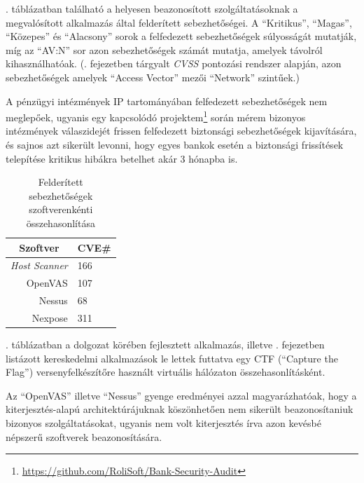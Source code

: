 	\Az{\ref{cpevulns}}. táblázatban található a helyesen beazonosított szolgáltatásoknak a megvalósított alkalmazás által felderített sebezhetőségei. A ``Kritikus'', ``Magas'', ``Közepes'' és ``Alacsony'' sorok a felfedezett sebezhetőségek súlyosságát mutatják, míg az ``AV:N'' sor azon sebezhetőségek számát mutatja, amelyek távolról kihasználhatóak. (\Az{\ref{ssec:cvss}}. fejezetben tárgyalt \textit{CVSS} pontozási rendszer alapján, azon sebezhetőségek amelyek ``Access Vector'' mezői ``Network'' szintűek.)
	
	A pénzügyi intézmények IP tartományában felfedezett sebezhetőségek nem meglepőek, ugyanis egy kapcsolódó projektem\footnote{\url{https://github.com/RoliSoft/Bank-Security-Audit}} során mérem bizonyos intézmények válaszidejét frissen felfedezett biztonsági sebezhetőségek kijavítására, és sajnos azt sikerült levonni, hogy egyes bankok esetén a biztonsági frissítések telepítése kritikus hibákra betelhet akár 3 hónapba is.
	
	\begin{table}[H]
		\centering
		\begin{tabular}{|r|l|}
			\hline
			\multicolumn{1}{|c|}{\textbf{Szoftver}} & \multicolumn{1}{c|}{\textbf{CVE\#}} \\ \hline
			\textit{Host Scanner\footnotemark{}}                   & 166                                 \\
			OpenVAS                                 & 107                                 \\
			Nessus                                  & 68                                  \\
			Nexpose                                 & 311                                 \\ \hline
		\end{tabular}
		\caption{Felderített sebezhetőségek szoftverenkénti összehasonlítása}
		\label{foundvulns}
	\end{table}
	
	\Az{\ref{foundvulns}}. táblázatban a dolgozat körében fejlesztett alkalmazás, illetve \az{\ref{ssec:comtools}}. fejezetben listázott kereskedelmi alkalmazások le lettek futtatva egy CTF (``Capture the Flag'') versenyfelkészítőre használt virtuális hálózaton összehasonlításként.
	
	Az ``OpenVAS'' illetve ``Nessus'' gyenge eredményei azzal magyarázhatóak, hogy a kiterjesztés-alapú architektúrájuknak köszönhetően nem sikerült beazonosítaniuk bizonyos szolgáltatásokat, ugyanis nem volt kiterjesztés írva azon kevésbé népszerű szoftverek beazonosítására.
	
